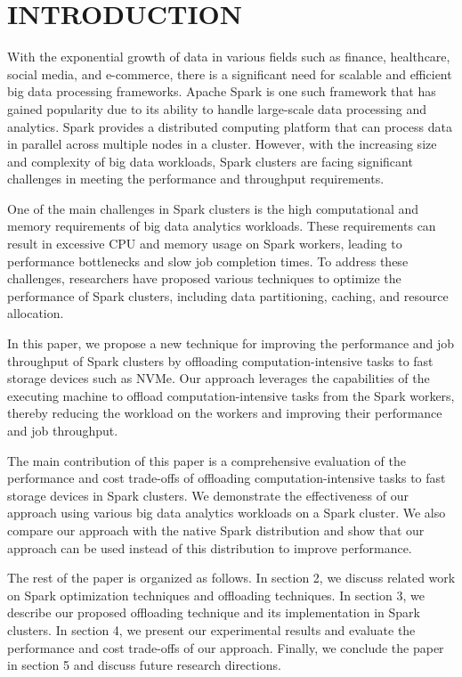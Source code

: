 \documentclass[twocolumn,10pt]{asme2e}
\begin{document}
\section*{INTRODUCTION}

With the exponential growth of data in various fields such as finance, healthcare, social media, and e-commerce, there is a significant need for scalable and efficient big data processing frameworks. Apache Spark is one such framework that has gained popularity due to its ability to handle large-scale data processing and analytics. Spark provides a distributed computing platform that can process data in parallel across multiple nodes in a cluster. However, with the increasing size and complexity of big data workloads, Spark clusters are facing significant challenges in meeting the performance and throughput requirements.

One of the main challenges in Spark clusters is the high computational and memory requirements of big data analytics workloads. These requirements can result in excessive CPU and memory usage on Spark workers, leading to performance bottlenecks and slow job completion times. To address these challenges, researchers have proposed various techniques to optimize the performance of Spark clusters, including data partitioning, caching, and resource allocation.

In this paper, we propose a new technique for improving the performance and job throughput of Spark clusters by offloading computation-intensive tasks to fast storage devices such as NVMe. Our approach leverages the capabilities of the executing machine to offload computation-intensive tasks from the Spark workers, thereby reducing the workload on the workers and improving their performance and job throughput.

The main contribution of this paper is a comprehensive evaluation of the performance and cost trade-offs of offloading computation-intensive tasks to fast storage devices in Spark clusters. We demonstrate the effectiveness of our approach using various big data analytics workloads on a Spark cluster. We also compare our approach with the native Spark distribution and show that our approach can be used instead of this distribution to improve performance.

The rest of the paper is organized as follows. In section 2, we discuss related work on Spark optimization techniques and offloading techniques. In section 3, we describe our proposed offloading technique and its implementation in Spark clusters. In section 4, we present our experimental results and evaluate the performance and cost trade-offs of our approach. Finally, we conclude the paper in section 5 and discuss future research directions.
\end{document}
